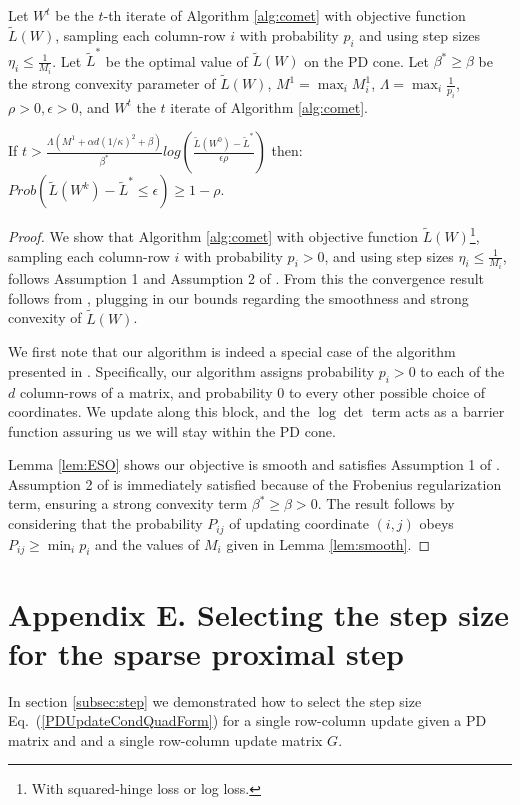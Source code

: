 \documentclass[twoside,11pt]{article}
\newcommand\mat[1]{{#1}}
\newcommand{\W}{\mat{W}}
\newcommand{\Pp}{\mat{P}}
\newcommand{\tL}{\tilde{L}(\W)}
\renewcommand{\eqref}[1]{Eq.~(\ref{#1})}
\begin{document}
\begin{theorem}
Let $\W^t$ be the $t$-th iterate of Algorithm \ref{alg:comet} with objective function $\tL$, sampling each column-row $i$ with probability $p_i$ and using step sizes $\eta_i \leq \frac{1}{M_i}$. Let $\tilde{L}^*$ be the optimal value of $\tL$ on the PD cone. Let $\beta^* \geq \beta$ be the strong convexity parameter of $\tL$, $M^1 = \max_i M^1_i$, $\Lambda = \max_i \frac{1}{p_i}$, $\rho >0, \epsilon>0$, and $W^t$ the $t$ iterate of Algorithm \ref{alg:comet}.

If $t > \frac{\Lambda (M^1 + \alpha d (1/\kappa)^2 + \beta)}{\beta^*} log \left( \frac{\tilde{L}(W^0) - \tilde{L}^*}{\epsilon \rho}\right)$ then: $Prob(\tilde{L}(\W^k) - \tilde{L}^* \leq \epsilon) \geq 1-\rho$.
\end{theorem}
\begin{proof}%
We show that Algorithm \ref{alg:comet} with objective function $\tL$\footnote{With squared-hinge loss or log loss.}, sampling each column-row $i$ with probability $p_i >0$, and using step sizes $\eta_i \leq \frac{1}{M_i}$, follows Assumption 1 and Assumption 2 of \citet{richtarik2013optimal}. From this the convergence result follows from \citeauthor[Theorem 3]{richtarik2013optimal}, plugging in our bounds regarding the smoothness and strong convexity of $\tL$.

We first note that our algorithm is indeed a special case of the algorithm presented in \citet{richtarik2013optimal}. Specifically, our algorithm assigns probability $p_i > 0 $ to each of the $d$ column-rows of a matrix, and probability $0$ to every other possible choice of coordinates. We update along this block, and the $\log \det$ term acts as a barrier function
assuring us we will stay within the PD cone.

Lemma \ref{lem:ESO} shows our objective is smooth and satisfies Assumption 1 of \citeauthor{richtarik2013optimal}. Assumption 2 of \citeauthor{richtarik2013optimal} is immediately satisfied because of the Frobenius regularization term, ensuring a strong convexity term $\beta^* \geq \beta > 0$. The result follows by considering that the probability $\Pp_{ij}$ of updating coordinate $(i,j)$ obeys $\Pp_{ij} \geq \min_i p_i $ and the values of $M_i$ given in Lemma \ref{lem:smooth}.

\end{proof}

\section*{Appendix E. Selecting the step size for the sparse proximal step}
In section \ref{subsec:step} we demonstrated how to select the step size \eqref{PDUpdateCondQuadForm} for a single row-column update given a PD matrix and and a single row-column update matrix $\mat{G}$. 
\end{document}
